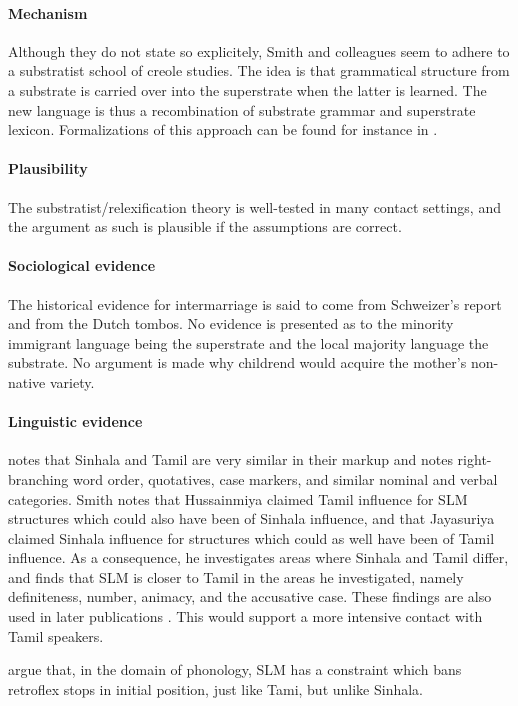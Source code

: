 \paragraph{Mechanism}
Although they do not state so explicitely, Smith and colleagues seem to adhere to a substratist school of creole studies. The idea is that grammatical structure from a substrate is carried over into the superstrate when the latter is learned. The new language is thus a recombination of substrate grammar and superstrate lexicon. Formalizations of this approach can be found for instance in \citep{Muysken, Lefebvre}.

\paragraph{Plausibility}
The substratist/relexification theory is well-tested in many contact settings, and the argument as such is plausible if the assumptions are correct.

\paragraph{Sociological evidence}
The historical evidence for intermarriage is said to come from Schweizer's report and from the Dutch tombos. No evidence is presented as to the minority immigrant language being the superstrate and the local majority language the substrate. No argument is made why childrend would acquire the mother's non-native variety.

\paragraph{Linguistic evidence}
\citet{SmithRH} notes that Sinhala and Tamil are very similar in their markup and notes right-branching word order, quotatives, case markers, and similar nominal and verbal categories. Smith notes that Hussainmiya claimed Tamil influence for SLM structures which could also have been of Sinhala influence, and that Jayasuriya claimed Sinhala influence for structures which could as well have been of Tamil influence. As a consequence, he investigates areas where Sinhala and Tamil differ, and finds that SLM is closer to Tamil in the areas he investigated, namely definiteness, number, animacy, and the accusative case. These findings are also used in later publications  \citet{SmithEtAl2004, SmithEtAl2007}. This would support a more intensive contact with Tamil speakers.

\citet{SmithEtAl2004} argue that, in the domain of phonology, SLM has a constraint which bans retroflex stops in initial position, just like Tami, but unlike Sinhala.

